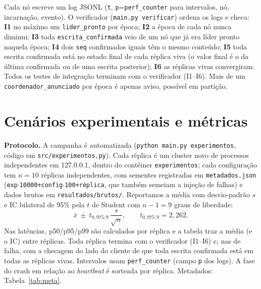 \documentclass[conference,a4paper]{IEEEtran}
\begin{document}
Cada nó escreve um log JSONL (\texttt{t}, \texttt{p}=\texttt{perf\_counter}
para intervalos, nó, incarnação, evento). O verificador
(\texttt{main.py verificar}) ordena os logs e checa: \textbf{I1} no máximo
um \texttt{lider\_pronto} por época; \textbf{I2} a época de cada nó nunca
diminui; \textbf{I3} toda \texttt{escrita\_confirmada} veio de um nó que já
era líder pronto naquela época; \textbf{I4} dois \texttt{seq} confirmados
iguais têm o mesmo conteúdo; \textbf{I5} toda escrita confirmada está no
estado final de cada réplica viva (o valor final é o da última confirmada
ou de uma escrita posterior); \textbf{I6} as réplicas vivas convergiram. Todos
os testes de integração terminam com o verificador (I1--I6). Mais de um
\texttt{coordenador\_anunciado} por época é apenas aviso, possível em
partição.

\section{Cenários experimentais e métricas}

\textbf{Protocolo.} A campanha é automatizada (\texttt{python main.py
experimentos}, código em \texttt{src/experimentos.py}). Cada réplica é um
cluster novo de processos independentes em 127.0.0.1, dentro do contêiner
\texttt{experimentos}; cada configuração tem $n=10$ réplicas
independentes, com sementes registradas em \texttt{metadados.json}
(\texttt{exp$\cdot$10000+config$\cdot$100+réplica}, que também semeiam a injeção
de falhas) e dados brutos em \texttt{resultados/brutos/}. Reportamos a média
com desvio-padrão $s$ e IC bilateral de 95\% pela $t$ de Student com $n-1=9$
graus de liberdade:
\begin{equation}
 \bar{x}\ \pm\ t_{0{,}975;9}\,\frac{s}{\sqrt{n}},\qquad t_{0{,}975;9}=2{,}262.
 \label{eq:ic}
\end{equation}
Nas latências, p50/p95/p99 são calculados por réplica e a tabela traz a
média (e o IC) entre réplicas. Toda réplica termina com o verificador (I1--I6)
e, nas de falha, com a checagem do lado do cliente de que toda escrita
confirmada está em todas as réplicas vivas. Intervalos usam
\texttt{perf\_counter} (campo \texttt{p} dos logs). A fase do crash
em relação ao \emph{heartbeat} é sorteada por réplica. Metadados:
Tabela~\ref{tab:meta}.
\end{document}
